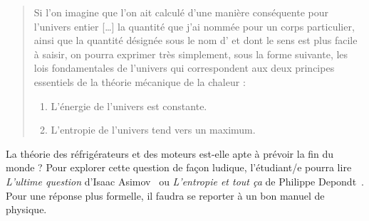 			\begin{quote}
				Si l’on imagine que l’on ait calculé d’une manière conséquente pour l’univers entier […] la quantité que j’ai nommée  pour un corps particulier, ainsi que la quantité désignée sous le nom d’ et dont le sens est plus facile à saisir, on pourra exprimer très simplement, sous la forme suivante, les lois fondamentales de l’univers qui correspondent aux deux principes essentiels de la théorie mécanique de la chaleur :
					\begin{enumerate}
						\item L’énergie de l’univers est constante.
						\item L’entropie de l’univers tend vers un maximum.
					\end{enumerate}
			\end{quote}
		
		La théorie des réfrigérateurs et des moteurs est-elle apte à prévoir la fin du monde ? Pour explorer cette question de façon ludique, l’étudiant/e pourra lire \textit{L’ultime question} d’Isaac \mbox{Asimov}~\cite{asimov1956,asimov1956fr} ou \textit{L’entropie et tout ça} de Philippe \mbox{Depondt}~\cite{depondt2001}. Pour une réponse plus formelle, il faudra se reporter à un bon manuel de physique.
